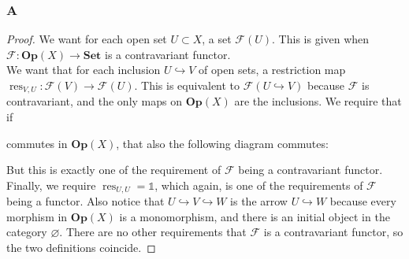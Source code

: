 \documentclass{article}
\newcommand{\fF}{\mathscr{F}}
\DeclareMathOperator{\res}{res}
\newcommand{\altid}{\mathds{1}}
\newcommand{\Set}{\mathbf{Set}} %
\newcommand{\Op}{\mathbf{Op}} %
\let\emptyset\varnothing
\begin{document}
\subsubsection{A}\label{2.2.A}
\begin{proof}
    We want for each open set $U\subset X$, a set $\fF(U)$. This is given when $\fF:\Op(X)\to \Set$ is a contravariant functor.\\
    We want that for each inclusion $U\hookrightarrow V$ of open sets, a restriction map $\res_{V,U}:\fF(V)\to \fF(U)$. This is equivalent to $\fF(U\hookrightarrow V)$ because $\fF$ is contravariant, and the only maps on $\Op(X)$ are the inclusions. We require that if
    \begin{center}
    \end{center}
    commutes in $\Op(X)$, that also the following diagram commutes:
    \begin{center}
    \end{center}
    But this is exactly one of the requirement of $\fF$ being a contravariant functor.\\
    Finally, we require $\res_{U,U}=\altid$, which again, is one of the requirements of $\fF$ being a functor. Also notice that $U\hookrightarrow V\hookrightarrow W$ is the arrow $U\hookrightarrow W$ because every morphism in $\Op(X)$ is a monomorphism, and there is an initial object in the category $\emptyset$. There are no other requirements that $\fF$ is a contravariant functor, so the two definitions coincide.
\end{proof}
\end{document}
